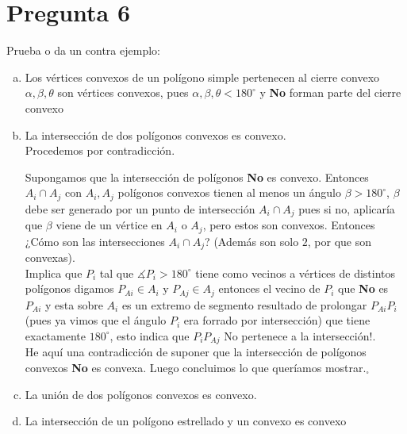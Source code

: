 \large\section*{Pregunta 6}\Large

Prueba o da un contra ejemplo:
\begin{enumerate}[a)]
      \item Los vértices convexos de un polígono simple pertenecen al cierre convexo\\
      $\alpha, \beta, \theta$ son vértices convexos, pues $\alpha, \beta, \theta < 180^\circ$ y \textbf{No} forman parte del cierre convexo 
      \item La intersección de dos polígonos convexos es convexo.\\
      Procedemos por contradicción.

      Supongamos que la intersección de polígonos \textbf{No} es convexo.
      Entonces $A_i\cap A_j$ con $A_i,A_j$ polígonos convexos tienen al menos
      un ángulo $\beta >180^\circ$, $\beta$ debe ser generado por un punto de
      intersección $A_i\cap A_j$ pues si no, aplicaría que $\beta$ viene de
      un vértice en $A_i$ o $A_j$, pero estos son convexos. Entonces
      ¿Cómo son las intersecciones $A_i\cap A_j$? (Además son solo $2$, por que
      son convexas).\\
      Implica que $P_i$ tal que $\measuredangle P_i > 180^\circ$ tiene como
      vecinos a vértices de distintos polígonos digamos $P_{Ai} \in A_i$ y 
      $P_{Aj} \in A_j$ entonces el vecino de $P_i$ que \textbf{No} es $P_{Ai}$
      y esta sobre $A_i$ es un extremo de segmento resultado de prolongar $P_{Ai} P_i$
      (pues ya vimos que el ángulo $P_i$ era forrado por intersección) que tiene
      exactamente $180^\circ$, esto indica que $P_i P_{Aj}$ No pertenece a la 
      intersección$!$.\\

      He aquí una contradicción de suponer que la intersección de polígonos
      convexos \textbf{No} es convexa. Luego concluimos lo que queríamos mostrar.$_\square$
      \item La unión de dos polígonos convexos es convexo.\\
      
      \item La intersección de un polígono estrellado y un convexo es convexo
\end{enumerate}